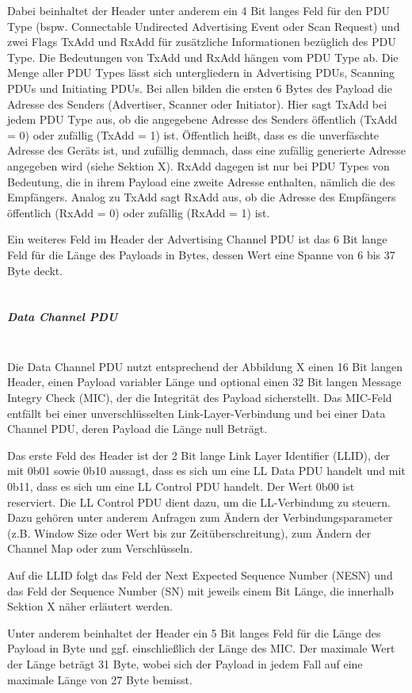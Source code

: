 Dabei beinhaltet der Header unter anderem ein 4 Bit langes Feld für den PDU Type (bspw. Connectable Undirected Advertising Event oder Scan Request) und zwei Flags TxAdd und RxAdd für zusätzliche Informationen bezüglich des PDU Type. Die Bedeutungen von TxAdd und RxAdd hängen vom PDU Type ab. Die Menge aller PDU Types lässt sich untergliedern in Advertising PDUs, Scanning PDUs und Initiating PDUs. Bei allen bilden die ersten 6 Bytes des Payload die Adresse des Senders (Advertiser, Scanner oder Initiator). Hier sagt TxAdd bei jedem PDU Type aus, ob die angegebene Adresse des Senders öffentlich (TxAdd = 0) oder zufällig (TxAdd = 1) ist. Öffentlich heißt, dass es die unverfäschte Adresse des Geräts ist, und zufällig demnach, dass eine zufällig generierte Adresse angegeben wird (siehe Sektion X).
RxAdd dagegen ist nur bei PDU Types von Bedeutung, die in ihrem Payload eine zweite Adresse enthalten, nämlich die des Empfängers. Analog zu TxAdd sagt RxAdd aus, ob die Adresse des Empfängers öffentlich (RxAdd = 0) oder zufällig (RxAdd = 1) ist.

Ein weiteres Feld im Header der Advertising Channel PDU ist das 6 Bit lange Feld für die Länge des Payloads in Bytes, dessen Wert eine Spanne von 6 bis 37 Byte deckt.
\\\\
\subparagraph{Data Channel PDU} \mbox{} \vspace{0.2cm} \\
Die Data Channel PDU nutzt entsprechend der Abbildung X 
einen 16 Bit langen Header, einen Payload variabler Länge und optional einen 32 Bit langen Message Integry Check (MIC), der die Integrität des Payload sicherstellt. Das MIC-Feld entfällt bei einer unverschlüsselten Link-Layer-Verbindung und bei einer Data Channel PDU, deren Payload die Länge null Beträgt.

Das erste Feld des Header ist der 2 Bit lange Link Layer Identifier (LLID), der mit 0b01 sowie 0b10 aussagt, dass es sich um eine LL Data PDU handelt und mit 0b11, dass es sich um eine LL Control PDU handelt. Der Wert 0b00 ist reserviert. Die LL Control PDU dient dazu, um die LL-Verbindung zu steuern. Dazu gehören unter anderem Anfragen zum Ändern der Verbindungsparameter (z.B. Window Size oder Wert bis zur Zeitüberschreitung), zum Ändern der Channel Map oder zum Verschlüsseln.

Auf die LLID folgt das Feld der Next Expected Sequence Number (NESN) und das Feld der Sequence Number (SN) mit jeweils einem Bit Länge, die innerhalb Sektion X 
näher erläutert werden.

Unter anderem beinhaltet der Header ein 5 Bit langes Feld für die Länge des Payload in Byte und ggf. einschließlich der Länge des MIC. Der maximale Wert der Länge beträgt 31 Byte, wobei sich der Payload in jedem Fall auf eine maximale Länge von 27 Byte bemisst.

